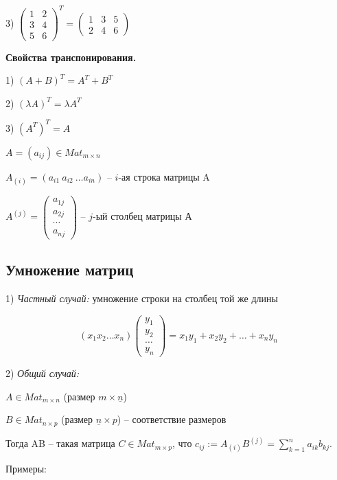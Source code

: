 3) $\begin{pmatrix} 1 & 2 \\ 3 & 4 \\ 5 & 6 \end{pmatrix}^T = \begin{pmatrix} 1 & 3 & 5 \\ 2 & 4 & 6 \end{pmatrix}$

\bigskip
\textbf{Свойства транспонирования.}

1) $(A+B)^T = A^T + B^T$

2) $(\lambda A)^T = \lambda A^T$

3) $(A^T)^T = A$

\bigskip
$A = (a_{ij}) \in Mat_{m \times n}$

$A_{(i)} = (a_{i1}\ a_{i2}\ \dots a_{in})$ -- $i$-ая строка матрицы A

$A^{(j)} = \begin{pmatrix}
    a_{1j} \\
    a_{2j} \\
    \cdots \\
    a_{nj}
	\end{pmatrix}$ -- $j$-ый столбец матрицы А

\bigskip
\subsection{Умножение матриц}

1) \textit{Частный случай:} умножение строки на столбец той же длины

\begin{equation*}(x_1 x_2 \dots x_n) \begin{pmatrix} y_1 \\ y_2 \\ \dots \\ y_n \end{pmatrix} = x_1 y_1 + x_2 y_2 + \dots + x_n y_n \end{equation*}

2) \textit{Общий случай:}

$A \in Mat_{m \times n}$ (размер $m \times \underline{n}$)

$B \in Mat_{n \times p}$ (размер $\underline{n} \times p$) -- соответствие размеров

\bigskip
Тогда AB -- такая матрица $C \in Mat_{m \times p}$, что $c_{ij} := A_{(i)}B^{(j)} = \sum\limits_{k=1}^n a_{ik} b_{kj}$.

Примеры:

